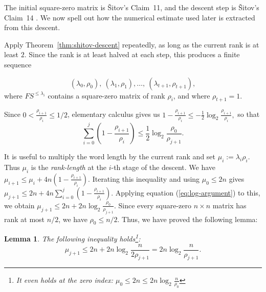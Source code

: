 \documentclass[11pt]{article}
\renewcommand{\geq}{\geqslant}
\renewcommand{\leq}{\leqslant}
\newtheorem{auxiliary proposition}[theorem]{Auxiliary Proposition}
\newtheorem{lemma}[theorem]{Lemma}
\newtheorem{main conjecture}[theorem]{Main Conjecture}
\newtheorem{main theorem}[theorem]{Main Theorem}
\newtheorem{modesty proposition}[theorem]{Modesty Proposition}
\newtheorem{open problem}[theorem]{Open Problem}
\newtheorem{convergence lemma}[theorem]{Convergence Lemma}
\newtheorem{corrected lemma}[theorem]{Corrected Lemma}
\newtheorem{growth lemma}[theorem]{Growth Lemma}
\newtheorem{coefficient lemma}[theorem]{Integrality Lemma}
\newtheorem{interpolation lemma}[theorem]{Interpolation Lemma}
\newtheorem{kernel lemma}[theorem]{Kernel Lemma}
\newtheorem{limit lemma}[theorem]{Limit Lemma}
\newtheorem{tandem lemma}[theorem]{Modesty Lemma}
\newtheorem{zero-finding lemma}[theorem]{Zero-Finding Lemma}
\numberwithin{equation}{section}
\begin{document}
The initial square-zero matrix is \v{S}itov's Claim~11, and the descent step is \v{S}itov's Claim~14 \cite[Claims~11 and~14]{Shitov2019}.  We now spell out how the numerical estimate used later is extracted from this descent.

Apply Theorem~\ref{thm:shitov-descent} repeatedly, as long as the current rank is at least $2$.  Since the rank is at least halved at each step, this produces a finite sequence


$$(\lambda_0,\rho_0),\ (\lambda_1,\rho_1),\ldots,\ (\lambda_{t+1},\rho_{t+1}),$$
where $F S^{\leq \lambda_i}$ contains a square-zero matrix of rank $\rho_i$, and where $\rho_{t+1}=1$.  %

Since $0<\frac{\rho_{i+1}}{\rho_{i}}\leq 1/2$, elementary calculus gives us
$ 1-\frac{\rho_{i+1}}{\rho_{i}}\leq -\frac{1}{2}\log_2 \frac{\rho_{i+1}}{\rho_{i}},$ so that 
\begin{equation}
	\label{eq:log-argument}
  \sum_{i=0}^j(1-\frac{\rho_{i+1}}{\rho_{i}})\leq\frac12\log_2\frac{\rho_0}{\rho_{j+1}}.
\end{equation}

 It is useful to multiply the word length by the current rank and set $\mu_i:=\lambda_i\rho_i.$ Thus $\mu_i$ is the \emph{rank-length} at the $i$-th stage of the descent.
 We  have  $ \mu_{i+1} \leq \mu_{i}+4n\left(1-\frac{\rho_{i+1}}{\rho_{i}}\right).$
Iterating this inequality and using $\mu_0\leq 2n$ gives
$ \mu_{j+1} \leq 2n+4n\sum_{i=0}^j\left(1-\frac{\rho_{i+1}}{\rho_{i}}\right).$ 
Applying equation (\ref{eq:log-argument}) to this, we obtain $%
  \mu_{j+1}\leq2n+2n\log_2\frac{\rho_0}{\rho_{j+1}}.$%
Since every square-zero $n\times n$ matrix has rank at most $n/2$, we have $\rho_0\leq n/2$. 
Thus, we have proved the following lemma:
\begin{lemma}\label{lem:mu-bound}The following inequality holds\footnote{It even holds at the zero index: $\mu_0\leq2n\leq2n\log_2\frac{n}{\rho_0}$}: $$\mu_{j+1} \leq 2n+2n\log_2\frac{n}{2\rho_{j+1}}=2n\log_2\frac{n}{\rho_{j+1}}.$$
\end{lemma}
\end{document}
